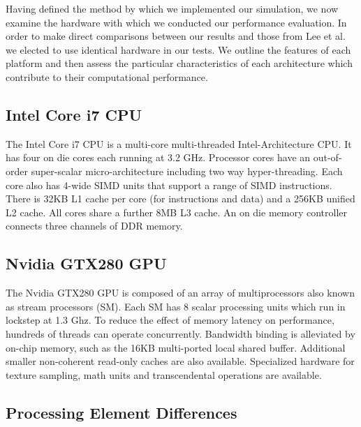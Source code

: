 \documentclass[conference]{IEEEtran}
\begin{document}
Having defined the method by which we implemented our simulation, we now examine the hardware with which we conducted our performance evaluation. In order to make direct comparisons between our results and those from Lee et al. we elected to use identical hardware in our tests. We outline the features of each platform and then assess the particular characteristics of each architecture which contribute to their computational performance.

\subsection{Intel Core i7 CPU}

The Intel Core i7 CPU is a multi-core multi-threaded Intel-Architecture CPU. It has four on die cores each running at 3.2 GHz. Processor cores have an out-of-order super-scalar micro-architecture including two way hyper-threading. Each core also has 4-wide SIMD units that support a range of SIMD instructions. There is 32KB L1 cache per core (for instructions and data) and a 256KB unified L2 cache. All cores share a further 8MB L3 cache. An on die memory controller connects three channels of DDR memory.

\subsection{Nvidia GTX280 GPU}

The Nvidia GTX280 GPU is composed of an array of multiprocessors also known as stream processors (SM). Each SM has 8 scalar processing units which run in lockstep at 1.3 Ghz. To reduce the effect of memory latency on performance, hundreds of threads can operate concurrently. Bandwidth binding is alleviated by on-chip memory, such as the 16KB multi-ported local shared buffer. Additional smaller non-coherent read-only caches are also available. Specialized hardware for texture sampling, math units and transcendental operations are available. 

\subsection{Processing Element Differences}
\end{document}
